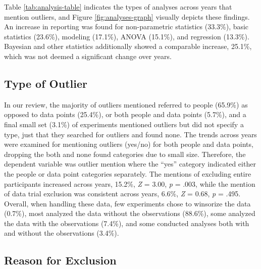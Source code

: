 \documentclass[english,,man,mask]{apa6}
\theoremstyle{definition}
\theoremstyle{definition}
\theoremstyle{definition}
\theoremstyle{remark}
\begin{document}
Table \ref{tab:analysis-table} indicates the types of analyses across
years that mention outliers, and Figure \ref{fig:analyses-graph}
visually depicts these findings. An increase in reporting was found for
non-parametric statistics (33.3\%), basic statistics (23.6\%), modeling
(17.1\%), ANOVA (15.1\%), and regression (13.3\%). Bayesian and other
statistics additionally showed a comparable increase, 25.1\%, which was
not deemed a significant change over years.

\subsection{Type of Outlier}\label{type-of-outlier}

In our review, the majority of outliers mentioned referred to people
(65.9\%) as opposed to data points (25.4\%), or both people and data
points (5.7\%), and a final small set (3.1\%) of experiments mentioned
outliers but did not specify a type, just that they searched for
outliers and found none. The trends across years were examined for
mentioning outliers (yes/no) for both people and data points, dropping
the both and none found categories due to small size. Therefore, the
dependent variable was outlier mention where the \enquote{yes} category
indicated either the people or data point categories separately. The
mentions of excluding entire participants increased across years,
15.2\%, \emph{Z} = 3.00, \emph{p} = .003, while the mention of data
trial exclusion was consistent across years, 6.6\%, \emph{Z} = 0.68,
\emph{p} = .495. Overall, when handling these data, few experiments
chose to winsorize the data (0.7\%), most analyzed the data without the
observations (88.6\%), some analyzed the data with the observations
(7.4\%), and some conducted analyses both with and without the
observations (3.4\%).

\subsection{Reason for Exclusion}\label{reason-for-exclusion}
\end{document}
